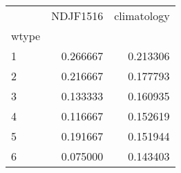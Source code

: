 \begin{tabular}{lrr}
\toprule
{} &  NDJF1516 &  climatology \\
wtype &           &              \\
\midrule
1     &  0.266667 &     0.213306 \\
2     &  0.216667 &     0.177793 \\
3     &  0.133333 &     0.160935 \\
4     &  0.116667 &     0.152619 \\
5     &  0.191667 &     0.151944 \\
6     &  0.075000 &     0.143403 \\
\bottomrule
\end{tabular}
